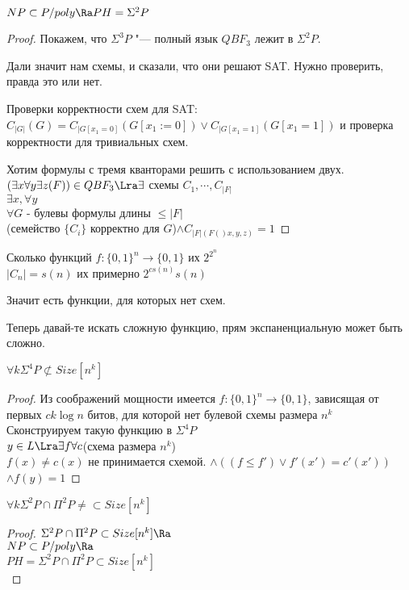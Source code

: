 \begin{theorem}
$NP \subset P/poly \Ra PH = \Sigma^2P$\\
\end{theorem}
\begin{proof}
Покажем, что $\Sigma^3P$ "--- полный язык $QBF_3$ лежит 
в $\Sigma^2P$.

Дали значит нам схемы, и сказали, что они решают SAT. Нужно проверить, 
правда это или нет. 

Проверки корректности схем для SAT:
$C_{|G|}(G) = C_{|G[x_1 = 0]}(G[x_1:= 0]) \vee C_{|G[x_1 = 1]}(G[x_1 = 1])$
и проверка корректности для тривиальных схем.

Хотим формулы с тремя кванторами решить с использованием двух.
$(\exists x\forall y \exists z(F)) \in QBF_3 \Lra\\
\exists$ схемы $C_1, \cdots, C_{|F|}$\\
$\exists x, \forall y$\\
$\forall G$ - булевы формулы длины $\le |F|$\\
(семейство $\{C_i\}$ корректно для $G$)$\wedge C_{|F|(F()x,y, z)} = 1$  
\end{proof}

Сколько функций $f\colon \{0, 1\}^n \to \{0, 1\}$ их $2^{2^n}$\\
$|C_n| = s(n)$ их примерно $2^{cs(n)}s(n)$

Значит есть функции, для которых нет схем. 

Теперь давай-те искать сложную функцию, прям экспаненциальную может быть сложно.
\begin{theorem}
$\forall k \Sigma^4P \not \subset Size[n^k]$\\
\end{theorem}
\begin{proof}
Из соображений мощности имеется $f\colon \{0, 1\}^n \to \{0, 1\}$, зависящая 
от первых $ck\log n$ битов, для которой нет булевой схемы размера $n^k$\\

Сконструируем такую функцию в $\Sigma^4P$\\
$y \in L \Lra \exists f \forall c$(схема размера $n^k$)\\
$f(x) \ne c(x)$ не принимается схемой.
$\wedge ((f \le f') \vee f'(x') = c'(x'))$
$\wedge f(y) = 1$ 
\end{proof}

\begin{conseq}
$\forall k \Sigma^2 P \cap \Pi^2P \ne \subset Size[n^k]$
\end{conseq}
\begin{proof}
$\Sigma^2P \cap \Pi^2P \subset Size[n^k] \Ra $\\
$NP \subset P/poly \Ra$\\
$PH = \Sigma^2P \cap \Pi^2P \subset Size[n^k]$\\
\end{proof}